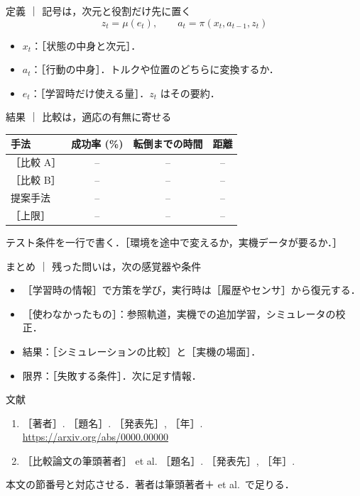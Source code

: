 \documentclass[aspectratio=169,10pt,t]{beamer}
\begin{document}
\begin{frame}{定義 ｜ 記号は，次元と役割だけ先に置く}
  \[
    z_t = \mu(e_t), \qquad a_t = \pi(x_t, a_{t-1}, z_t)
  \]

  \begin{itemize}
    \item $x_t$：［状態の中身と次元］．
    \item $a_t$：［行動の中身］．トルクや位置のどちらに変換するか．
    \item $e_t$：［学習時だけ使える量］．$z_t$ はその要約．
  \end{itemize}

\end{frame}

\begin{frame}{結果 ｜ 比較は，適応の有無に寄せる}
  \vspace{0.4em}
  \centering
  {\footnotesize
  \begin{tabular}{lccc}
    \toprule
    手法 & 成功率 (\%) & 転倒までの時間 & 距離 \\
    \midrule
    ［比較 A］ & -- & -- & -- \\
    ［比較 B］ & -- & -- & -- \\
    提案手法 & -- & -- & -- \\
    \midrule
    ［上限］ & -- & -- & -- \\
    \bottomrule
  \end{tabular}}

  \vspace{0.8em}
  \raggedright
  テスト条件を一行で書く．［環境を途中で変えるか，実機データが要るか．］

\end{frame}

\begin{frame}{まとめ ｜ 残った問いは，次の感覚器や条件}
  \begin{itemize}
    \item ［学習時の情報］で方策を学び，実行時は［履歴やセンサ］から復元する．
    \item ［使わなかったもの］：参照軌道，実機での追加学習，シミュレータの校正．
    \item 結果：［シミュレーションの比較］と［実機の場面］．
    \item 限界：［失敗する条件］．次に足す情報．
  \end{itemize}

\end{frame}

\begin{frame}{文献}
  {\small
  \begin{enumerate}
    \item ［著者］. ［題名］. ［発表先］, ［年］.\\
      \url{https://arxiv.org/abs/0000.00000}
    \item ［比較論文の筆頭著者］ et al. ［題名］. ［発表先］, ［年］.
  \end{enumerate}}
  \vfill
  {\scriptsize\color{muted}
  本文の節番号と対応させる．著者は筆頭著者＋ et al.\ で足りる．}
\end{frame}
\end{document}
